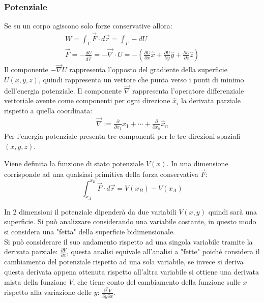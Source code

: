 \documentclass{article}
\numberwithin{equation}{subsection}
\begin{document}
\subsubsection{Potenziale}


Se su un corpo agiscono solo forze conservative allora:
\begin{gather*}
    W=\int_{\Gamma}\vec{F}\cdot d\vec{r}=\int_{\Gamma}-dU\\
    \vec{F}=-\displaystyle\frac{dU}{d\vec{r}}=-\vec{\nabla}\cdot U=-\left(\displaystyle\frac{\partial U}{\partial x}\hat{x}+\frac{\partial U}{\partial y}\hat{y}+\frac{\partial U}{\partial z}\hat{z}\right)
\end{gather*} 
Il componente $-\vec{\nabla}U$ rappresenta l'opposto del gradiente della superficie $U(x,y,z)$, quindi rappresenta un vettore che punta verso i punti di minimo dell'energia 
potenziale. Il componente $\vec{\nabla}$ rappresenta l'operatore differenziale vettoriale avente come componenti per ogni direzione $\hat{x}_i$ la derivata parziale rispetto 
a quella coordinata:
\begin{gather*}
    \vec{\nabla}:=\displaystyle\frac{\partial}{\partial x_1}\hat{x}_1+\cdots+\frac{\partial}{\partial x_n}\hat{x}_n
\end{gather*}
Per l'energia potenziale presenta tre componenti per le tre direzioni spaziali $(x,y,z)$. 


Viene definita la funzione di stato potenziale $V(x)$. In una dimensione corrisponde ad una qualsiasi primitiva della forza conservativa $\vec{F}$:
\begin{equation*}
    \displaystyle\int_{x_A}^{x_B}\vec{F}\cdot d\vec{r}=V(x_B)-V(x_A)
\end{equation*}



In $2$ dimensioni il potenziale dipenderà da due variabili $V(x,y)$ 
quindi sarà una superficie. Si può analizzare considerando una 
variabile costante, in questo modo si 
considera una "fetta" della superficie bidimensionale.
\\
Si può considerare il suo andamento rispetto ad una singola 
variabile tramite la derivata parziale: $\displaystyle\frac{\partial V}{\partial x}$, 
questa analisi equivale all'analisi a "fette" poiché 
considera il cambiamento del potenziale rispetto ad una sola variabile, se invece si deriva questa derivata 
appena ottenuta rispetto all'altra variabile si ottiene una derivata 
mista della funzione $V$, che tiene conto del cambiamento della 
funzione sulle $x$ rispetto alla variazione delle $y$: $\displaystyle\frac{\partial^{2} V}{\partial y\partial x}$. 
\end{document}
